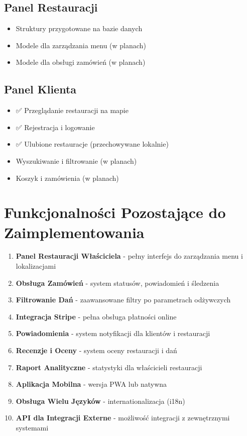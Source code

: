 \documentclass[12pt,a4paper,utf-8]{article}
\begin{document}
\subsection{Panel Restauracji}

\begin{itemize}
    \item Struktury przygotowane na bazie danych
    \item Modele dla zarządzania menu (w planach)
    \item Modele dla obsługi zamówień (w planach)
\end{itemize}

\subsection{Panel Klienta}

\begin{itemize}
    \item ✅ Przeglądanie restauracji na mapie
    \item ✅ Rejestracja i logowanie
    \item ✅ Ulubione restauracje (przechowywane lokalnie)
    \item Wyszukiwanie i filtrowanie (w planach)
    \item Koszyk i zamówienia (w planach)
\end{itemize}

\section{Funkcjonalności Pozostające do Zaimplementowania}

\begin{enumerate}
    \item \textbf{Panel Restauracji Właściciela}  -  pełny interfejs do zarządzania menu i lokalizacjami
    \item \textbf{Obsługa Zamówień}  -  system statusów, powiadomień i śledzenia
    \item \textbf{Filtrowanie Dań}  -  zaawansowane filtry po parametrach odżywczych
    \item \textbf{Integracja Stripe}  -  pełna obsługa płatności online
    \item \textbf{Powiadomienia}  -  system notyfikacji dla klientów i restauracji
    \item \textbf{Recenzje i Oceny}  -  system oceny restauracji i dań
    \item \textbf{Raport Analityczne}  -  statystyki dla właścicieli restauracji
    \item \textbf{Aplikacja Mobilna}  -  wersja PWA lub natywna
    \item \textbf{Obsługa Wielu Języków}  -  internationalizacja (i18n)
    \item \textbf{API dla Integracji Externe}  -  możliwość integracji z zewnętrznymi systemami
\end{enumerate}
\end{document}
